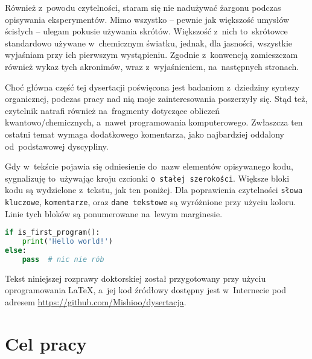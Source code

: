Również z~powodu czytelności, staram się nie nadużywać żargonu podczas opisywania eksperymentów.
Mimo wszystko \--- pewnie jak większość umysłów ścisłych \--- ulegam pokusie używania skrótów.
Większość z~nich to~skrótowce standardowo używane w~chemicznym światku,
jednak, dla jasności, wszystkie wyjaśniam przy ich pierwszym wystąpieniu.
Zgodnie z~konwencją zamieszczam również wykaz tych akronimów, wraz z~wyjaśnieniem, na~następnych stronach.

Choć główna część tej dysertacji poświęcona jest badaniom z~dziedziny syntezy organicznej,
podczas pracy nad nią moje zainteresowania poszerzyły się.
Stąd też, czytelnik natrafi również na~fragmenty dotyczące obliczeń kwantowo\-/chemicznych, a~nawet programowania komputerowego.
Zwłaszcza ten ostatni temat wymaga dodatkowego komentarza, jako najbardziej oddalony od~podstawowej dyscypliny.

Gdy w~tekście pojawia się odniesienie do~nazw elementów opisywanego kodu,
sygnalizuję to~używając kroju czcionki \lstinline!o stałej szerokości!.
Większe bloki kodu są wydzielone z~tekstu, jak ten poniżej.
Dla poprawienia czytelności 
\lstinline[basicstyle=\ttfamily\color{wongvermillion},columns=fixed]!słowa kluczowe!, 
\lstinline[basicstyle=\ttfamily\color{wongsky},columns=fixed]!komentarze!, oraz 
\lstinline[basicstyle=\ttfamily\color{wonggreen},columns=fixed]!dane tekstowe!
są wyróżnione przy użyciu koloru.
Linie tych bloków są ponumerowane na~lewym marginesie.

\begin{lstlisting}[language=Python]
if is_first_program():
    print('Hello world!')
else:
    pass  # nic nie rób
\end{lstlisting}

Tekst niniejszej rozprawy doktorskiej został przygotowany przy użyciu oprogramowania \LaTeX,
a~jej kod źródłowy dostępny jest w~Internecie pod adresem \url{https://github.com/Mishioo/dysertacja}.

\begin{fullwidth}
\printglossary[title=Wykaz skrótów, type=\acronymtype]
\end{fullwidth}

\section{Cel pracy}
